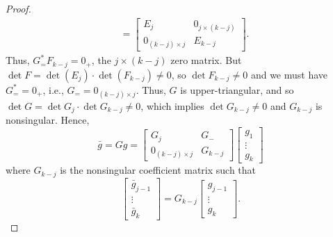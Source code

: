 \documentclass[11pt, oneside, a4paper]{article}
\begin{document}
{\begin{proof}
\begin{align*}
    &= \begin{bmatrix}
        E_j & 0_{j\times (k-j)}\\
        0_{(k-j)\times j} & E_{k-j}
    \end{bmatrix}.
\end{align*}
Thus, $G^*_=F_{k-j}=0_+$, the $j\times (k-j)$ zero matrix. But $\det F = \det(E_j)\cdot \det(F_{k-j})\neq 0$, so $\det F_{k-j}\neq 0$ and we must have $G^*_==0_+$, i.e., $G_= =0_{(k-j)\times j}$. Thus, $G$ is upper-triangular, and so $\det G = \det G_j \cdot \det G_{k-j}\neq 0$, which implies $\det G_{k-j}\neq 0$ and $G_{k-j}$ is nonsingular. Hence,
\[\bar{g} = Gg = \begin{bmatrix}G_j & G_-\\
0_{(k-j)\times j} & G_{k-j}\end{bmatrix} \begin{bmatrix}
g_1\\
\vdots\\
g_k
\end{bmatrix}\]
where $G_{k-j}$ is the nonsingular coefficient matrix such that
\[\begin{bmatrix}
    \bar{g}_{j-1}\\
    \vdots\\
    \bar{g}_{k}
\end{bmatrix} = G_{k-j}\begin{bmatrix}
    g_{j-1}\\
    \vdots\\
    g_{k}
\end{bmatrix}.\]
\end{proof}
}
\end{document}
